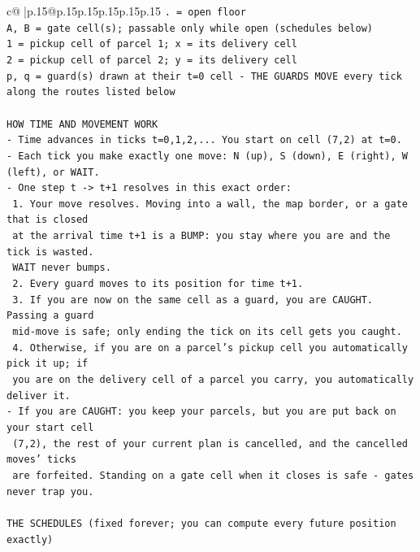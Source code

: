 \documentclass{article}
\begin{document}
{\begin{supertabular}{c@{$\;$}|p{.15\linewidth}@{}p{.15\linewidth}p{.15\linewidth}p{.15\linewidth}p{.15\linewidth}p{.15\linewidth}}
{{{\texttt{. = open floor} \\
\texttt{A, B = gate cell(s); passable only while open (schedules below)} \\
\texttt{1 = pickup cell of parcel 1; x = its delivery cell} \\
\texttt{2 = pickup cell of parcel 2; y = its delivery cell} \\
\texttt{p, q = guard(s) drawn at their t=0 cell {-} THE GUARDS MOVE every tick along the routes listed below} \\
\\ 
\texttt{HOW TIME AND MOVEMENT WORK} \\
\texttt{{-} Time advances in ticks t=0,1,2,... You start on cell (7,2) at t=0.} \\
\texttt{{-} Each tick you make exactly one move: N (up), S (down), E (right), W (left), or WAIT.} \\
\texttt{{-} One step t {-}> t+1 resolves in this exact order:} \\
\texttt{  1. Your move resolves. Moving into a wall, the map border, or a gate that is closed} \\
\texttt{     at the arrival time t+1 is a BUMP: you stay where you are and the tick is wasted.} \\
\texttt{     WAIT never bumps.} \\
\texttt{  2. Every guard moves to its position for time t+1.} \\
\texttt{  3. If you are now on the same cell as a guard, you are CAUGHT. Passing a guard} \\
\texttt{     mid{-}move is safe; only ending the tick on its cell gets you caught.} \\
\texttt{  4. Otherwise, if you are on a parcel's pickup cell you automatically pick it up; if} \\
\texttt{     you are on the delivery cell of a parcel you carry, you automatically deliver it.} \\
\texttt{{-} If you are CAUGHT: you keep your parcels, but you are put back on your start cell} \\
\texttt{  (7,2), the rest of your current plan is cancelled, and the cancelled moves' ticks} \\
\texttt{  are forfeited. Standing on a gate cell when it closes is safe {-} gates never trap you.} \\
\\ 
\texttt{THE SCHEDULES (fixed forever; you can compute every future position exactly)} \\
}}}
\end{supertabular}}
\end{document}
